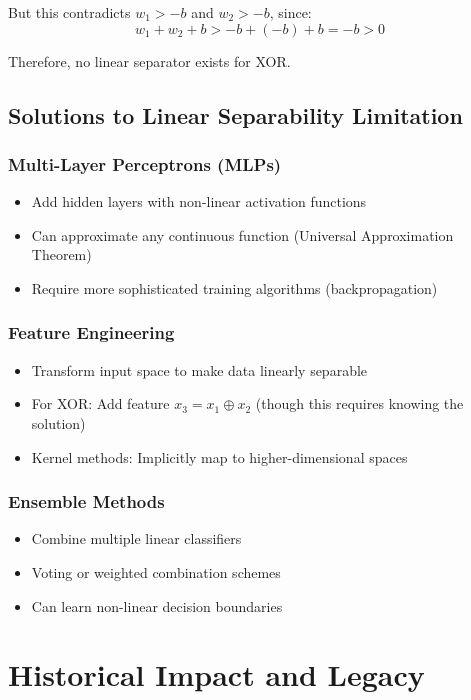 But this contradicts \(w_1 > -b\) and \(w_2 > -b\), since:
\[w_1 + w_2 + b > -b + (-b) + b = -b > 0\]

Therefore, no linear separator exists for XOR.

\subsection{Solutions to Linear Separability Limitation}
\subsubsection{Multi-Layer Perceptrons (MLPs)}
\begin{itemize}
    \item Add hidden layers with non-linear activation functions
    \item Can approximate any continuous function (Universal Approximation Theorem)
    \item Require more sophisticated training algorithms (backpropagation)
\end{itemize}

\subsubsection{Feature Engineering}
\begin{itemize}
    \item Transform input space to make data linearly separable
    \item For XOR: Add feature \(x_3 = x_1 \oplus x_2\) (though this requires knowing the solution)
    \item Kernel methods: Implicitly map to higher-dimensional spaces
\end{itemize}

\subsubsection{Ensemble Methods}
\begin{itemize}
    \item Combine multiple linear classifiers
    \item Voting or weighted combination schemes
    \item Can learn non-linear decision boundaries
\end{itemize}

\section{Historical Impact and Legacy}
